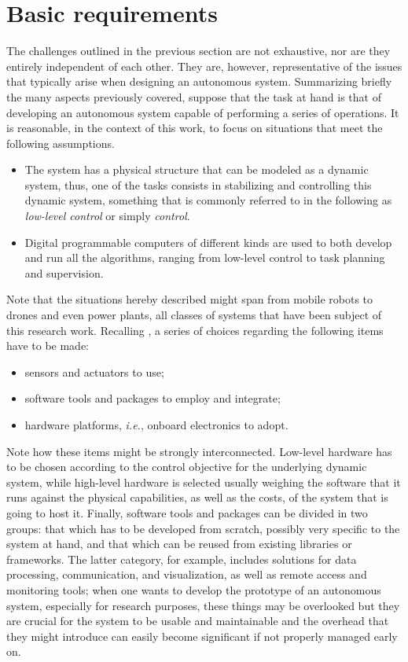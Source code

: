 \section{Basic requirements}
\label{sec:prb_requirements}
The challenges outlined in the previous section are not exhaustive, nor are they entirely independent of each other. They are, however, representative of the issues that typically arise when designing an autonomous system. Summarizing briefly the many aspects previously covered, suppose that the task at hand is that of developing an autonomous system capable of performing a series of operations. It is reasonable, in the context of this work, to focus on situations that meet the following assumptions.
\begin{itemize}
  \item The system has a physical structure that can be modeled as a dynamic system, thus, one of the tasks consists in stabilizing and controlling this dynamic system, something that is commonly referred to in the following as \emph{low-level control} or simply \emph{control}.
  \item Digital programmable computers of different kinds are used to both develop and run all the algorithms, ranging from low-level control to task planning and supervision.
\end{itemize}
Note that the situations hereby described might span from mobile robots to drones and even power plants, all classes of systems that have been subject of this research work. Recalling , a series of choices regarding the following items have to be made:
\begin{itemize}
  \item sensors and actuators to use;
  \item software tools and packages to employ and integrate;
  \item hardware platforms, \emph{i.e.}, onboard electronics to adopt.
\end{itemize}
Note how these items might be strongly interconnected. Low-level hardware has to be chosen according to the control objective for the underlying dynamic system, while high-level hardware is selected usually weighing the software that it runs against the physical capabilities, as well as the costs, of the system that is going to host it. Finally, software tools and packages can be divided in two groups: that which has to be developed from scratch, possibly very specific to the system at hand, and that which can be reused from existing libraries or frameworks. The latter category, for example, includes solutions for data processing, communication, and visualization, as well as remote access and monitoring tools; when one wants to develop the prototype of an autonomous system, especially for research purposes, these things may be overlooked but they are crucial for the system to be usable and maintainable and the overhead that they might introduce can easily become significant if not properly managed early on.

